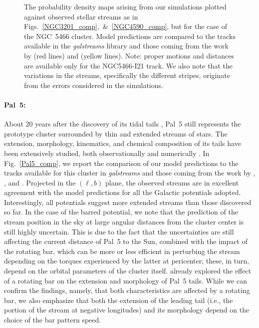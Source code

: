 \begin{figure}
                \caption{The probability density maps arising from our simulations plotted against observed stellar streams as in Figs.~\ref{NGC3201_comp},~\&~\ref{NGC4590_comp}, but for the case of the NGC~5466 cluster. Model predictions are compared to the tracks available in the \textit{galstreams} library and those coming from the work by  \citet{2006ApJ...639L..17G} (red lines) and \citet{2021ApJ...914..123I} (yellow lines). Note: proper motions and distances are available only for the NGC5466-I21 track. We also note that the variations in the streams, specifically the different stripes, originate from the errors considered in the simulations.\label{NGC5466_comp}}
            \end{figure}  
            \onecolumn          
            
            \paragraph{Pal~5: } About 20 years after the discovery of its tidal tails \citep{2001ApJ...548L.165O, 2003AJ....126.2385O}, Pal~5 still represents the prototype cluster surrounded by thin and extended streams of stars. The extension, morphology, kinematics, and chemical composition of its tails have been extensively studied, both observationally and numerically \citep{2003AJ....126.2385O, 2002AJ....124..349R, 2004AJ....127.2753D, 2004AJ....128.2274K, 2006ApJ...641L..37G, 2009AJ....137.3378O, 2012A&A...546L...7M, 2015ApJ...803...80K, 2015MNRAS.446.3297K, 2015ApJ...811..123F, 2016ApJ...819....1I, 2016ApJ...823..157I, 2016MNRAS.460.2711T, 2017A&A...601A..41K, 2017ApJ...842..120I, 2017NatAs...1..633P, 2019AJ....158..223P, 2020MNRAS.493.4978S, 2020ApJ...889...70B, 2021ApJ...914..123I, 2022MNRAS.510.3727P, 2015MNRAS.446.3297K}. In Fig.~\ref{Pal5_comp}, we report the comparison of our model predictions to the tracks available for this cluster in \textit{galstreams} and  those coming from the work by \citet{2019AJ....158..223P}, \citet{2020MNRAS.493.4978S}, and \citet{2021ApJ...914..123I}. Projected in the $(\ell, b)$ plane, the observed streams are in excellent agreement with the model predictions for all the Galactic potentials adopted. Interestingly, all potentials suggest more extended streams than those discovered so far. In the case of the barred potential, we note that the prediction of the stream position in the sky at large angular distances from the cluster center is still highly uncertain. This is due to the fact that the uncertainties are still affecting the current distance of Pal~5 to the Sun, combined with the impact of the rotating bar, which can be more or less efficient in perturbing the stream depending on the torques experienced by the latter at pericenter; these, in turn, depend on the orbital parameters of the cluster itself. \citet{2017NatAs...1..633P} already explored the effect of a rotating bar on the extension and morphology of Pal~5 tails. While we can confirm the \citet{2017NatAs...1..633P} findings, namely, that both characteristics are affected by a rotating bar, we also emphasize that both the extension of the leading tail (i.e., the portion of the stream at negative longitudes) and its morphology depend on the choice of the bar pattern speed. 